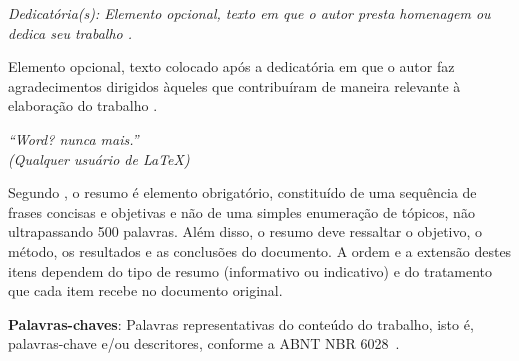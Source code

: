 \documentclass[
	12pt,				    %
	openright,			    %
	oneside,			    %
	a4paper,			    %
    sumario=tradicional,    %
	english,			    %
	brazil,				    %
	]{abntex2}
\begin{document}
\frenchspacing

\pretextual

\imprimircapa

\imprimirfolhaderosto

\imprimirfolhadeaprovacao

\begin{dedicatoria}
   \vspace*{\fill}
   \centering
   \noindent
   \textit{Dedicat\'oria(s): Elemento opcional, texto em que o autor presta homenagem ou dedica seu trabalho \cite{NBR14724:2011}.}
   \vspace*{\fill}
\end{dedicatoria}

\begin{agradecimentos}
Elemento opcional, texto colocado ap\'os a dedicat\'oria em que o autor faz agradecimentos dirigidos àqueles que contribuíram de maneira relevante à elaboração do trabalho \cite{NBR14724:2011}. 
\end{agradecimentos}

\begin{epigrafe}
    \vspace*{\fill}
	\begin{flushright}
		\textit{``Word? nunca mais.''\\
		(Qualquer usuário de \LaTeX)}
	\end{flushright}
\end{epigrafe}


\begin{resumo}
 \noindent
Segundo \cite{NBR6028:2003}, o resumo é elemento obrigat\'orio, constitu\'ido de uma sequ\^encia de frases concisas e objetivas e n\~ao de uma simples enumera\c c\~ao de t\'opicos, não ultrapassando 500 palavras. Além disso, o resumo deve ressaltar o objetivo, o método, os resultados e as conclusões do documento. A ordem e a extensão destes itens dependem do tipo de resumo (informativo ou indicativo) e do tratamento que cada item recebe no documento original. 
 \vspace{\onelineskip}

 \noindent
 \textbf{Palavras-chaves}: Palavras representativas do conteúdo do trabalho, isto é, palavras-chave e/ou descritores, conforme a ABNT NBR 6028~\cite{NBR6028:2003}.
\end{resumo}
\end{document}
